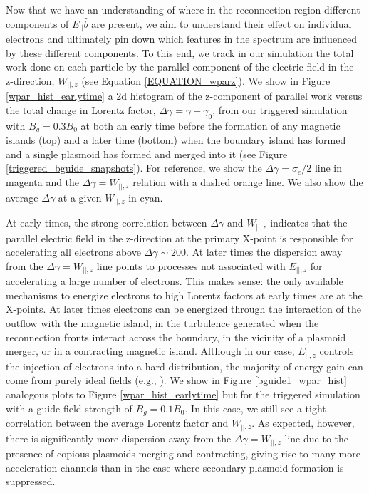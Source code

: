 Now that we have an understanding of where in the reconnection region different components of $E_{||}\hat{b}$ are present, we aim to understand their effect on individual electrons and ultimately pin down which features in the spectrum are influenced by these different components.  To this end, we track in our simulation the total work done on each particle by the parallel component of the electric field in the z-direction, $W_{||,z}$ (see Equation \ref{EQUATION_wparz}).  We show in Figure \ref{wpar_hist_earlytime} a 2d histogram of the z-component of parallel work versus the total change in Lorentz factor, $\Delta \gamma = \gamma - \gamma_{0}$, from our triggered simulation with $B_{g}=0.3B_{0}$ at both an early time before the formation of any magnetic islands (top) and a later time (bottom) when the boundary island has formed and a single plasmoid has formed and merged into it (see Figure \ref{triggered_bguide_snapshots}).  For reference, we show the $\Delta \gamma=\sigma_{e}/2$ line in magenta and the $\Delta \gamma=W_{||,z}$ relation with a dashed orange line.  We also show the average $\Delta \gamma$ at a given $W_{||,z}$ in cyan.  

At early times, the strong correlation between $\Delta \gamma$ and $W_{||,z}$ indicates that the parallel electric field in the z-direction at the primary X-point is responsible for accelerating all electrons above $\Delta \gamma \sim 200$.  At later times the dispersion away from the $\Delta \gamma = W_{||,z}$ line points to processes not associated with $E_{||,z}$ for accelerating a large number of electrons.  This makes sense: the only available mechanisms to energize electrons to high Lorentz factors at early times are at the X-points.  At later times electrons can be energized through the interaction of the outflow with the magnetic island, in the turbulence generated when the reconnection fronts interact across the boundary, in the vicinity of a plasmoid merger, or in a contracting magnetic island.  Although in our case, $E_{||,z}$ controls the injection of electrons into a hard distribution, the majority of energy gain can come from purely ideal fields (e.g., \citealt{guo2019}).  We show in Figure \ref{bguide1_wpar_hist} analogous plots to Figure \ref{wpar_hist_earlytime} but for the triggered simulation with a guide field strength of $B_{g}=0.1B_{0}$.  In this case, we still see a tight correlation between the average Lorentz factor and $W_{||,z}$.  As expected, however, there is significantly more dispersion away from the $\Delta \gamma=W_{||,z}$ line due to the presence of copious plasmoids merging and contracting, giving rise to many more acceleration channels than in the case where secondary plasmoid formation is suppressed.


